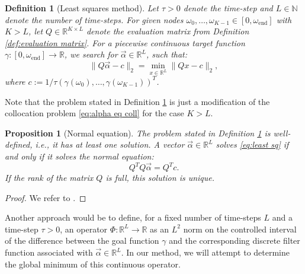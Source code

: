 \documentclass[a4paper,11pt,bibliography=totoc,listof=totoc,headinclude=true,cleardoublepage=empty,oneside]{scrbook}
\newtheorem{definition}[theorem]{Definition}
\newtheorem{prop}[theorem]{Proposition}
\newcommand{\R}{\mathbb{R}}
\newcommand{\N}{\mathbb{N}}
\newcommand{\e}{\mathrm{end}}
\begin{document}
\begin{definition}[Least squares method]\label{def:least sq}
    Let $\tau>0$ denote the time-step and $L \in \N$ denote the number of time-steps. For given nodes $\omega_0, \dots, \omega_{K-1} \in [0, \omega_\e]$ with $K>L$, let $Q\in\R^{K\times L}$ denote the evaluation matrix from Definition \ref{def:evaluation matrix}. For a piecewise continuous target function $\gamma : [0, \omega_\e] \rightarrow \R$, we search for $\Vec{\alpha} \in \R^{L}$, such that:
    \begin{equation}\label{eq:least sq}
        \| Q\vec{\alpha} - c \|_2 = \min_{x\in \R^L} \| Qx - c \|_2,
    \end{equation}
    where $c := 1/\tau \left(\gamma(\omega_0), \dots, \gamma(\omega_{K-1})\right)^T$.
\end{definition}

Note that the problem stated in Definition \ref{def:least sq} is just a modification of the collocation problem \eqref{eq:alpha eq coll} for the case $K>L$.

\begin{prop}[Normal equation]\label{prop:normal eq}
    The problem stated in Definition \ref{def:least sq} is well-defined, i.e., it has at least one solution. A vector $\Vec{\alpha} \in \R^{L}$ solves \eqref{eq:least sq} if and only if it solves the normal equation:
    \begin{equation}\label{eq:normal eq}
        Q^T Q \Vec{\alpha} = Q^T c.
    \end{equation}
    If the rank of the matrix $Q$ is full, this solution is unique.
\end{prop}
\begin{proof}
    We refer to \cite[p. 103]{Praetorius}.
\end{proof}

Another approach would be to define, for a fixed number of time-steps $L$ and a time-step $\tau>0$, an operator $\Phi: \R^L \rightarrow \R$ as an $L^2$ norm on the controlled interval of the difference between the goal function $\gamma$ and the corresponding discrete filter function associated with $\Vec{\alpha} \in \R^L$. In our method, we will attempt to determine the global minimum of this continuous operator.
\end{document}
